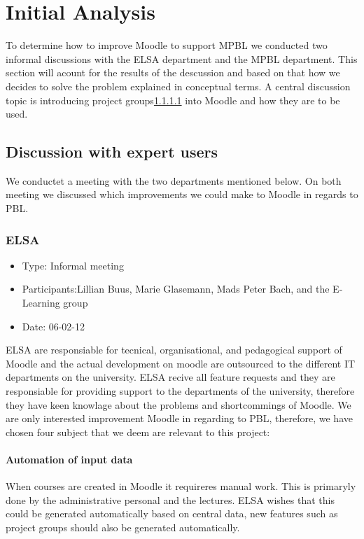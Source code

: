 \section{Initial Analysis}
\label{sec:initialAnalysis}
To determine how to improve Moodle to support MPBL we conducted two informal discussions with the ELSA department\cite{elsa} and the MPBL department\cite{mpbl}. This section will acount for the results of the descussion and based on that how we decides to solve the problem explained in conceptual terms. A central discussion topic is introducing project groups\ref{}  into Moodle and how they are to be used.     

\subsection{Discussion with expert users}  
\label{sub:expertUsers} 
We conductet a meeting with the two departments mentioned below. On both meeting we discussed which improvements we could make to Moodle in regards to PBL.  

\subsubsection{ELSA}
\begin{itemize}
	\item Type: Informal meeting
	\item Participants:Lillian Buus, Marie Glasemann, Mads Peter Bach, and the E-Learning group  
	\item Date: 06-02-12
\end{itemize}
ELSA are responsiable for tecnical, organisational, and pedagogical support of Moodle\cite{elsa} and the actual development on moodle are outsourced to the different IT departments on the university. ELSA recive all feature requests and they are responsiable for providing support to the departments of the university, therefore they have keen knowlage about the problems and shortcommings of Moodle. We are only interested improvement Moodle in regarding to PBL, therefore, we have chosen four subject that we deem are relevant to this project:

\paragraph{Automation of input data} When courses are created in Moodle it requireres manual work. This is primaryly done by the administrative personal and the lectures. ELSA wishes that this could be generated automatically based on central data, new features such as project groups should also be generated automatically.     
